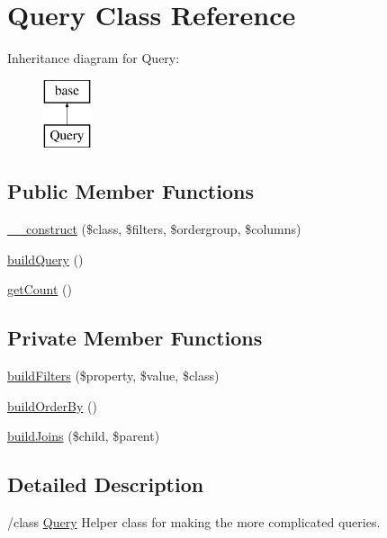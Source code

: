 \hypertarget{class_query}{
\section{Query Class Reference}
\label{class_query}
}
Inheritance diagram for Query:\begin{figure}[H]
\begin{center}
\leavevmode
\includegraphics[height=2.000000cm]{class_query}
\end{center}
\end{figure}
\subsection*{Public Member Functions}
\begin{DoxyCompactItemize}
\item 
\hyperlink{class_query_a28e580fac4fbdedecd32b8ccb932b157}{\_\-\_\-construct} (\$class, \$filters, \$ordergroup, \$columns)
\item 
\hyperlink{class_query_a394445491b1b221e4e562dfb45f2a266}{buildQuery} ()
\item 
\hyperlink{class_query_a24d4dbc71552d9387256a3cc426e3898}{getCount} ()
\end{DoxyCompactItemize}
\subsection*{Private Member Functions}
\begin{DoxyCompactItemize}
\item 
\hyperlink{class_query_ab06befc62bc4505f608c0c91b033ffd4}{buildFilters} (\$property, \$value, \$class)
\item 
\hyperlink{class_query_aa82a704f8e159f9e9cc7a693638d6bd3}{buildOrderBy} ()
\item 
\hyperlink{class_query_ac80ccbaf28b2e5a762b95947f4b96b12}{buildJoins} (\$child, \$parent)
\end{DoxyCompactItemize}


\subsection{Detailed Description}
/class \hyperlink{class_query}{Query} Helper class for making the more complicated queries. 


